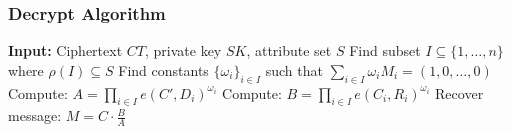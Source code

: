 \documentclass[11pt,a4paper]{article}
\begin{document}
\subsubsection{Decrypt Algorithm}

\begin{algorithm}
\caption{KP-ABE Decrypt}
\begin{algorithmic}
\STATE \textbf{Input:} Ciphertext $CT$, private key $SK$, attribute set $S$
\STATE Find subset $I \subseteq \{1, \ldots, n\}$ where $\rho(I) \subseteq S$
\STATE Find constants $\{\omega_i\}_{i \in I}$ such that $\sum_{i \in I} \omega_i M_i = (1, 0, \ldots, 0)$
\STATE Compute: $A = \prod_{i \in I} e(C', D_i)^{\omega_i}$
\STATE Compute: $B = \prod_{i \in I} e(C_i, R_i)^{\omega_i}$
\STATE Recover message: $M = C \cdot \frac{B}{A}$
\end{algorithmic}
\end{algorithm}
\end{document}
